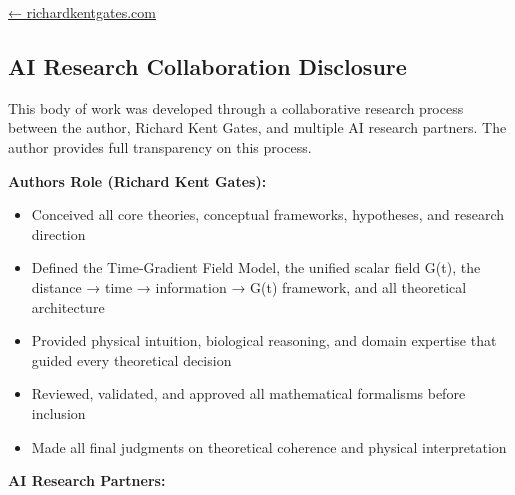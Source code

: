 \documentclass[
  10pt,
]{article}
\providecommand{\tightlist}{%
  \setlength{\itemsep}{0pt}\setlength{\parskip}{0pt}}
\begin{document}
\href{https://richardkentgates.com/}{← richardkentgates.com}

\hypertarget{ai-research-collaboration-disclosure}{%
\subsection{AI Research Collaboration
Disclosure}\label{ai-research-collaboration-disclosure}}

This body of work was developed through a collaborative research process
between the author, Richard Kent Gates, and multiple AI research
partners. The author provides full transparency on this process.

\textbf{Author\textquotesingle s Role (Richard Kent Gates):}

\begin{itemize}
\tightlist
\item
  Conceived all core theories, conceptual frameworks, hypotheses, and
  research direction
\item
  Defined the Time-Gradient Field Model, the unified scalar field G(t),
  the distance → time → information → G(t) framework, and all
  theoretical architecture
\item
  Provided physical intuition, biological reasoning, and domain
  expertise that guided every theoretical decision
\item
  Reviewed, validated, and approved all mathematical formalisms before
  inclusion
\item
  Made all final judgments on theoretical coherence and physical
  interpretation
\end{itemize}

\textbf{AI Research Partners:}
\end{document}
